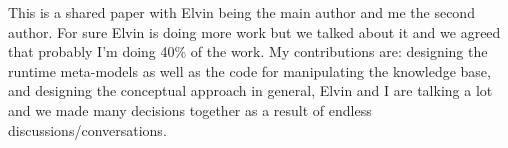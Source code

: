 This is a shared paper with Elvin being the main author and me the second author. For sure Elvin is doing more work but we talked about it and we agreed that probably I'm doing 40\% of the work. My contributions are: designing the runtime meta-models as well as the code for manipulating the knowledge base, and designing the conceptual approach in general, Elvin and I are talking a lot and we made many decisions together as a result of endless discussions/conversations.





